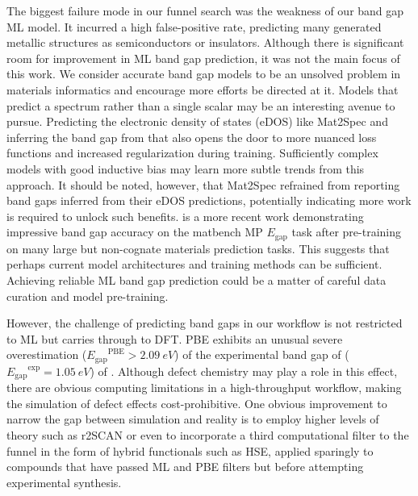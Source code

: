 \documentclass{article}
\newcommand{\CsTaTeO}[1][]{\ch{CsTaTeO6#1}}
\newcommand{\egap}{{E_\text{gap}}}
\begin{document}
The biggest failure mode in our funnel search was the weakness of our band gap ML model.
It incurred a high false-positive rate, predicting many generated metallic structures as semiconductors or insulators.
Although there is significant room for improvement in ML band gap prediction, it was not the main focus of this work.
We consider accurate band gap models to be an unsolved problem in materials informatics and encourage more efforts be directed at it.
Models that predict a spectrum rather than a single scalar may be an interesting avenue to pursue.
Predicting the electronic density of states (eDOS) like Mat2Spec \cite{kong_density_2021} and inferring the band gap from that also opens the door to more nuanced loss functions and increased regularization during training.
Sufficiently complex models with good inductive bias may learn more subtle trends from this approach.
It should be noted, however, that Mat2Spec refrained from reporting band gaps inferred from their eDOS predictions, potentially indicating more work is required to unlock such benefits.
\citeauthor*{shoghi_molecules_2023} \cite{shoghi_molecules_2023} is a more recent work demonstrating impressive band gap accuracy on the matbench MP $\egap$ task after pre-training on many large but non-cognate materials prediction tasks.
This suggests that perhaps current model architectures and training methods can be sufficient.
Achieving reliable ML band gap prediction could be a matter of careful data curation and model pre-training.

However, the challenge of predicting band gaps in our workflow is not restricted to ML but carries through to DFT.
PBE exhibits an unusual severe overestimation ($\egap^\text{PBE} > \SI{2.09}{eV}$) of the experimental band gap of ($\egap^\text{exp} = \SI{1.05}{eV}$) of \CsTaTeO{}.
Although defect chemistry may play a role in this effect, there are obvious computing limitations in a high-throughput workflow, making the simulation of defect effects cost-prohibitive.
One obvious improvement to narrow the gap between simulation and reality is to employ higher levels of theory such as r2SCAN or even to incorporate a third computational filter to the funnel in the form of hybrid functionals such as HSE, applied sparingly to compounds that have passed ML and PBE filters but before attempting experimental synthesis.
\end{document}
